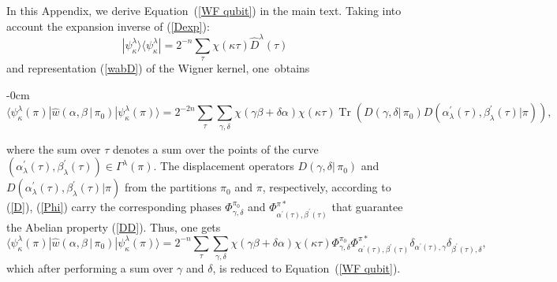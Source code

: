 \documentclass[quantumrep,article,accept,pdftex,moreauthors]{Definitions/mdpi}
\DeclareMathOperator{\Tr}{Tr}
\begin{document}
In this Appendix, we derive Equation~(\ref{WF qubit}) in the main text. Taking into
account the expansion inverse of (\ref{Dexp}):
\begin{equation}
  |\psi_{\kappa }^{\lambda}\rangle \langle \psi_{\kappa }^{\lambda}|
  = 2^{-n}
  \sum_{\tau }\chi (\kappa \tau )\hat{D}^{\lambda }(\tau )
\end{equation}
and  representation (\ref{wabD}) of the Wigner kernel, one~obtains
\begin{adjustwidth}{-\extralength}{0cm}
\begin{equation}
  \langle \psi_{\kappa}^{\lambda}(\pi)
  |\hat{w}\left(\alpha,\beta\,|\,\pi_{0}\right)
  |\psi_{\kappa}^{\lambda}(\pi)\rangle
  = 2^{-2n} \sum_{\tau} \sum\limits_{\gamma,\delta}
  \chi\left( \gamma \beta + \delta \alpha \right)\chi(\kappa \tau)
  \Tr\left(
    D\left( \gamma, \delta |\,\pi_{0} \right)
    D\left(
      \alpha_{\lambda}^{\prime}(\tau),\beta_{\lambda}^{\prime }(\tau)|\pi
    \right)
  \right),
\end{equation}
\end{adjustwidth}
where the sum over $\tau$ denotes a sum over the points of the curve
$\left(\alpha_{\lambda}^{\prime}(\tau),\beta_{\lambda}^{\prime}(\tau)\right) \in
\Gamma^{\lambda}(\pi)$. The displacement operators $D\left(\gamma,\delta
|\,\pi_{0}\right)$ and
$D\left(\alpha_{\lambda}^{\prime}(\tau),\beta_{\lambda}^{\prime
}(\tau)|\pi\right)$ from the partitions $\pi_{0}$ and $\pi$, respectively,
according to (\ref{D}), (\ref{Phi}) carry the corresponding phases
$\Phi_{\gamma,\delta}^{\pi_{0}}$ and
$\Phi_{\alpha^{\prime}(\tau),\beta^{\prime}(\tau )}^{\pi \ast }$ that guarantee
the Abelian property (\ref{DD}). Thus, one gets
\begin{equation}
  \langle \psi_{\kappa}^{\lambda }(\pi)
  |\hat{w}\left(\alpha,\beta\,|\,\pi _{0}\right)
  |\psi_{\kappa}^{\lambda}(\pi)\rangle
  = 2^{-n}
  \sum_{\tau}\sum\limits_{\gamma,\delta}
  \chi\left(\gamma \beta +\delta \alpha\right) \chi (\kappa \tau)
  \Phi_{\gamma,\delta }^{\pi_{0}}
  \Phi_{\alpha^{\prime}(\tau),\beta^{\prime}(\tau)}^{\pi\ast}
  \delta_{\alpha^{\prime }(\tau),\gamma}
  \delta_{\beta^{\prime }(\tau),\delta},
\end{equation}
which after performing a sum over $\gamma$ and $\delta$, is reduced to
Equation~(\ref{WF qubit}).

\section[\appendixname~\thesection]{}
\label{appB}
\end{document}

